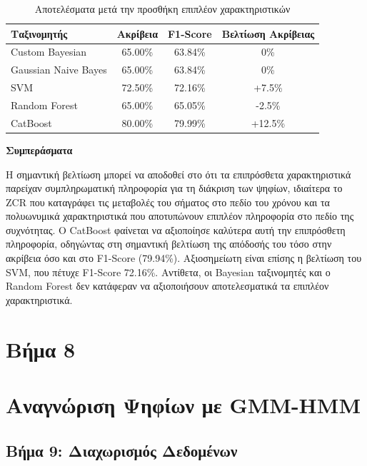 \documentclass[a4paper,12pt]{article}
\begin{document}
\begin{table}[h]
    \centering
    \begin{tabular}{lccc}
        \hline
        \textbf{Ταξινομητής} & \textbf{Ακρίβεια} & \textbf{F1-Score} & \textbf{Βελτίωση Ακρίβειας} \\
        \hline
        Custom Bayesian      & 65.00\%           & 63.84\%           & 0\%                         \\
        Gaussian Naive Bayes & 65.00\%           & 63.84\%           & 0\%                         \\
        SVM                  & 72.50\%           & 72.16\%           & +7.5\%                      \\
        Random Forest        & 65.00\%           & 65.05\%           & -2.5\%                      \\
        CatBoost             & 80.00\%           & 79.99\%           & +12.5\%                     \\
        \hline
    \end{tabular}
    \caption{Αποτελέσματα μετά την προσθήκη επιπλέον χαρακτηριστικών}
\end{table}

\textbf{Συμπεράσματα}

Η σημαντική βελτίωση μπορεί να αποδοθεί στο ότι τα επιπρόσθετα χαρακτηριστικά παρείχαν
συμπληρωματική πληροφορία για τη διάκριση των ψηφίων, ιδιαίτερα το ZCR που καταγράφει
τις μεταβολές του σήματος στο πεδίο του χρόνου και τα πολυωνυμικά χαρακτηριστικά που
αποτυπώνουν επιπλέον πληροφορία στο πεδίο της συχνότητας. Ο CatBoost φαίνεται να
αξιοποίησε καλύτερα αυτή την επιπρόσθετη πληροφορία, οδηγώντας στη σημαντική βελτίωση
της απόδοσής του τόσο στην ακρίβεια όσο και στο F1-Score (79.94\%). Αξιοσημείωτη
είναι επίσης η βελτίωση του SVM, που πέτυχε F1-Score 72.16\%. Αντίθετα, οι Bayesian
ταξινομητές και ο Random Forest δεν κατάφεραν να αξιοποιήσουν αποτελεσματικά τα
επιπλέον χαρακτηριστικά.

\section*{Βήμα 8}

\section*{Αναγνώριση Ψηφίων με GMM-HMM}

\subsection*{Βήμα 9: Διαχωρισμός Δεδομένων}
\end{document}
